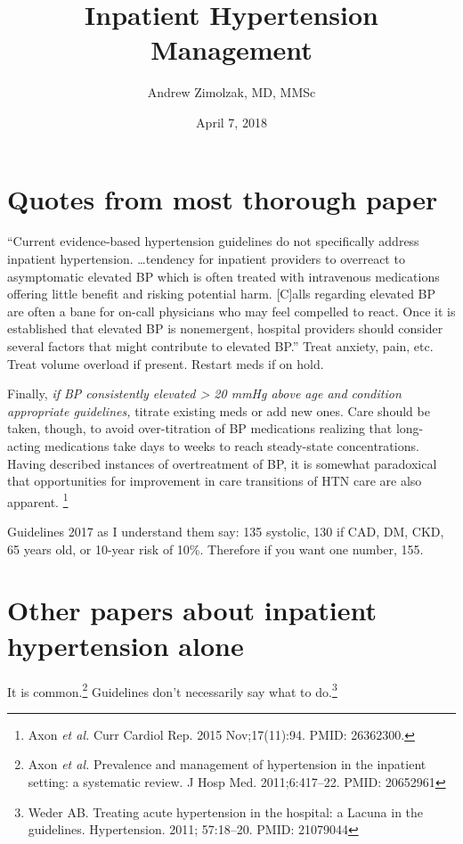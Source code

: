 \documentclass{tufte-handout}
\title{Inpatient Hypertension Management}
\author{Andrew Zimolzak, MD, MMSc}
\date{April 7, 2018}
\begin{document}
\maketitle


\section{Quotes from most thorough paper}

``Current evidence-based hypertension guidelines do not specifically
address inpatient hypertension. \ldots{}tendency for inpatient
providers to overreact to asymptomatic elevated BP which is often
treated with intravenous medications offering little benefit and
risking potential harm. [C]alls regarding elevated BP are often a bane
for on-call physicians who may feel compelled to react. Once it is
established that elevated BP is nonemergent, hospital providers should
consider several factors that might contribute to elevated BP.'' Treat
anxiety, pain, etc. Treat volume overload if present. Restart meds if
on hold.

Finally, \emph{if BP consistently elevated > 20 mmHg above age and
  condition appropriate guidelines,} titrate existing meds or add new
ones. Care should be taken, though, to avoid over-titration of BP
medications realizing that long-acting medications take days to weeks
to reach steady-state concentrations. Having described instances of
overtreatment of BP, it is somewhat paradoxical that opportunities for
improvement in care transitions of HTN care are also
apparent. \footnote{Axon \emph{et al.} Curr Cardiol Rep. 2015 Nov;17(11):94.
  PMID: 26362300.}

Guidelines 2017 as I understand them say: 135 systolic, 130 if CAD,
DM, CKD, 65 years old, or 10-year risk of 10\%. Therefore if you want
one number, 155.

\section{Other papers about inpatient hypertension alone}

It is common.\footnote{Axon \emph{et al.} Prevalence and management of
  hypertension in the inpatient setting: a systematic review. J Hosp
  Med. 2011;6:417--22. PMID: 20652961} Guidelines don't necessarily say
what to do.\footnote{Weder AB. Treating acute hypertension in the
  hospital: a Lacuna in the guidelines. Hypertension. 2011; 57:18--20.
  PMID: 21079044}
\end{document}

